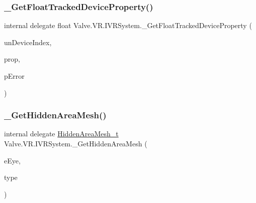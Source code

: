 \mbox{\label{struct_valve_1_1_v_r_1_1_i_v_r_system_a463f30e32dfce512ceed667f548e83ed}} 
\subsubsection{\texorpdfstring{\_GetFloatTrackedDeviceProperty()}{\_GetFloatTrackedDeviceProperty()}}
{\footnotesize\ttfamily internal delegate float Valve.\+V\+R.\+I\+V\+R\+System.\+\_\+\+Get\+Float\+Tracked\+Device\+Property (\begin{DoxyParamCaption}\item[{uint}]{un\+Device\+Index,  }\item[{\mbox{\hyperlink{namespace_valve_1_1_v_r_ab060521ead7273986988fc4897e52482}{E\+Tracked\+Device\+Property}}}]{prop,  }\item[{ref \mbox{\hyperlink{namespace_valve_1_1_v_r_aab6684f03930a2d2cf22ed66b437e47b}{E\+Tracked\+Property\+Error}}}]{p\+Error }\end{DoxyParamCaption})}

\mbox{\label{struct_valve_1_1_v_r_1_1_i_v_r_system_a2778354bdfffa5063ed74f2634feb02d}} 
\subsubsection{\texorpdfstring{\_GetHiddenAreaMesh()}{\_GetHiddenAreaMesh()}}
{\footnotesize\ttfamily internal delegate \mbox{\hyperlink{struct_valve_1_1_v_r_1_1_hidden_area_mesh__t}{Hidden\+Area\+Mesh\+\_\+t}} Valve.\+V\+R.\+I\+V\+R\+System.\+\_\+\+Get\+Hidden\+Area\+Mesh (\begin{DoxyParamCaption}\item[{\mbox{\hyperlink{namespace_valve_1_1_v_r_a8153d4a3e627e1cede046327087c1880}{E\+V\+R\+Eye}}}]{e\+Eye,  }\item[{\mbox{\hyperlink{namespace_valve_1_1_v_r_a2ed1af4858f23bc73d7358e8fcde5c64}{E\+Hidden\+Area\+Mesh\+Type}}}]{type }\end{DoxyParamCaption})}

